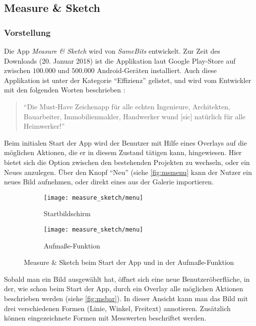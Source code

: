 \subsection{Measure \& Sketch}
\subsubsection{Vorstellung}
Die App \emph{Measure \& Sketch} wird von \emph{SameBits} entwickelt.
Zur Zeit des Downloads (20. Januar 2018) ist die Applikation laut Google Play-Store auf zwischen $100.000$ und $500.000$ Android-Geräten installiert.
Auch diese Applikation ist unter der Kategorie ``Effizienz'' gelistet, und wird vom Entwickler mit den folgenden Worten beschrieben \citep{BitsMS}:

\begin{quote}
  ``Die Must-Have Zeichenapp für alle echten Ingenieure, Architekten, Bauarbeiter, Immobilienmakler, Handwerker wund [sic] natürlich für alle Heimwerker!''
\end{quote}

\noindent
Beim initialen Start der App wird der Benutzer mit Hilfe eines Overlays auf die möglichen Aktionen, die er in diesem Zustand tätigen kann, hingewiesen.
Hier bietet sich die Option zwischen den bestehenden Projekten zu wechseln, oder ein Neues anzulegen.
Über den Knopf ``Neu'' (siehe \autoref{fig:msmenu} kann der Nutzer ein neues Bild aufnehmen, oder direkt eines aus der Galerie importieren. \\

\begin{figure}[h]
  \centering
	\begin{subfigure}[b]{0.4\textwidth}
		\texttt{[image: measure\_sketch/menu]}
		\caption{Startbildschirm}
		\label{fig:msmenu}	
	\end{subfigure}
	\begin{subfigure}[b]{0.4\textwidth}
		\texttt{[image: measure\_sketch/menu]}
		\caption{Aufmaße-Funktion} 
		\label{fig:msbar}	
	\end{subfigure}
  \caption{Measure \& Sketch beim Start der App und in der Aufmaße-Funktion}
\end{figure}

\noindent
{}
Sobald man ein Bild ausgewählt hat, öffnet sich eine neue Benutzeröberfläche, in der, wie schon beim Start der App, durch ein Overlay alle möglichen Aktionen beschrieben werden (siehe \autoref{fig:msbar}).
In dieser Ansicht kann man das Bild mit drei verschiedenen Formen (Linie, Winkel, Freitext) annotieren. 
Zusätzlich können eingezeichnete Formen mit Messwerten beschriftet werden.\\


